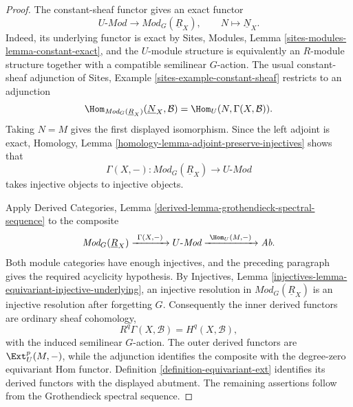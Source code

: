 \begin{proof}
The constant-sheaf functor gives an exact functor
$$
U\text{-}\textit{Mod}
\longrightarrow
\textit{Mod}_G(\underline R_X),
\qquad
N\longmapsto\underline N_X.
$$
Indeed, its underlying functor is exact by Sites, Modules, Lemma
\ref{sites-modules-lemma-constant-exact}, and the $U$-module structure is
equivalently an $R$-module structure together with a compatible semilinear
$G$-action. The usual constant-sheaf adjunction of Sites, Example
\ref{sites-example-constant-sheaf} restricts to an adjunction
$$
\Hom_{\textit{Mod}_G(\underline R_X)}(\underline N_X,\mathcal B)
=
\Hom_U(N,\Gamma(X,\mathcal B)).
$$
Taking $N=M$ gives the first displayed isomorphism. Since the left adjoint
is exact, Homology, Lemma
\ref{homology-lemma-adjoint-preserve-injectives} shows that
$$
\Gamma(X,-):\textit{Mod}_G(\underline R_X)\longrightarrow U\text{-}\textit{Mod}
$$
takes injective objects to injective objects.

Apply Derived Categories, Lemma
\ref{derived-lemma-grothendieck-spectral-sequence} to the composite
$$
\textit{Mod}_G(\underline R_X)
\xrightarrow{\ \Gamma(X,-)\ }
U\text{-}\textit{Mod}
\xrightarrow{\ \Hom_U(M,-)\ }
\textit{Ab}.
$$
Both module categories have enough injectives, and the preceding paragraph
gives the required acyclicity hypothesis. By Injectives, Lemma
\ref{injectives-lemma-equivariant-injective-underlying}, an injective
resolution in $\textit{Mod}_G(\underline R_X)$ is an injective resolution
after forgetting $G$. Consequently the inner derived functors are ordinary
sheaf cohomology,
$$
R^q\Gamma(X,\mathcal B)=H^q(X,\mathcal B),
$$
with the induced semilinear $G$-action. The outer derived functors are
$\Ext_U^p(M,-)$, while the adjunction identifies the composite with the
degree-zero equivariant Hom functor. Definition
\ref{definition-equivariant-ext} identifies its derived functors with the
displayed abutment. The remaining assertions follow from the Grothendieck
spectral sequence.
\end{proof}


